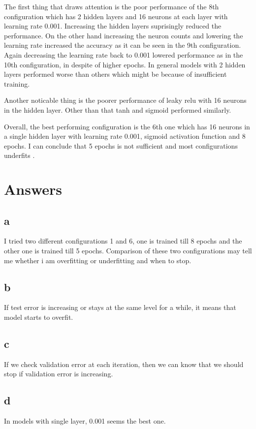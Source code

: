 \documentclass[12pt,a4paper, margin=1in]{article}
\begin{document}
The first thing that draws attention is the poor performance of the 8th configuration which has 2 hidden layers and 16 neurons at each layer with learning rate 0.001. Increasing the hidden layers suprisingly reduced the performance. On the other hand increasing the neuron counts and lowering the learning rate increased the accuracy as it can be seen in the 9th configuration.
Again decreasing the learning rate back to 0.001 lowered performance as in the 10th configuration, in despite of higher epochs. 
In general models with 2 hidden layers performed worse than others which might be because of insufficient training. 

Another noticable thing is the poorer performance of leaky relu with 16 neurons in the hidden layer. Other than that tanh and sigmoid performed similarly.

Overall, the best performing configuration is the 6th one which has 16 neurons in a single hidden layer with learning rate 0.001, sigmoid activation function and 8 epochs.
I can conclude that 5 epochs is not sufficient and most configurations underfits
.
\section*{Answers}
\subsection*{a}
I tried two different configurations 1 and 6, one is trained till 8 epochs and the other one is trained till 5 epochs. Comparison of these two configurations may tell me whether i am overfitting or underfitting and when to stop.

\subsection*{b}
If test error is increasing or stays at the same level for a while, it means that model starts to overfit.

\subsection*{c}
If we check validation error at each iteration, then we can know that we should stop if validation error is increasing.

\subsection*{d}
In models with single layer, 0.001 seems the best one.
\end{document}
